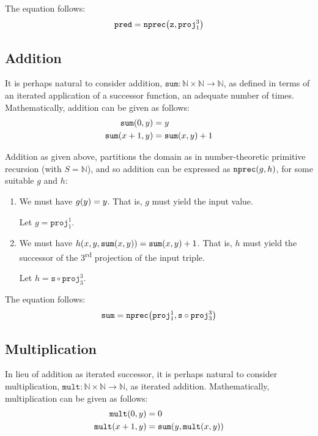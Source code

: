 The equation follows:\begin{align*}
%
\mathtt{pred} = \mathtt{nprec}\p{\mathtt{z}, \mathtt{proj}^3_1}
%
\end{align*}

\subsection{Addition}

It is perhaps natural to consider addition, $\mathtt{sum} : \mathbb{N} \times
\mathbb{N} \rightarrow \mathbb{N}$, as defined in terms of an iterated
application of a successor function, an adequate number of times.
Mathematically, addition can be given as follows:\begin{align*}
%
\mathtt{sum}\p{0, y} &= y \\
%
\mathtt{sum}\p{x+1, y} &= \mathtt{sum}\p{x,y} + 1 
%
\end{align*}

Addition as given above, partitions the domain as in number-theoretic primitive
recursion (with $S = \mathbb{N}$), and so addition can be expressed as
$\mathtt{nprec}{\mathopen{}\left({g,h}\right)\mathclose{}}$, for some suitable $g$ and $h$:

\begin{enumerate}[label=(\arabic*)]

\item We must have $g{\mathopen{}\left({y}\right)\mathclose{}} = y$. That is, $g$ must yield the input value.

Let $g = \mathtt{proj}^1_1$.

\item We must have $h{\mathopen{}\left({x,y,\mathtt{sum}{\mathopen{}\left({x,y}\right)\mathclose{}}}\right)\mathclose{}} = \mathtt{sum}{\mathopen{}\left({x,y}\right)\mathclose{}} + 1$.
That is, $h$ must yield the successor of the 3\textsuperscript{rd} projection
of the input triple.

Let $h = \mathtt{s} \circ \mathtt{proj}^3_3$.

\end{enumerate}

The equation follows:\begin{align*}
%
\mathtt{sum} = \mathtt{nprec}\p{\mathtt{proj}^1_1, \mathtt{s} \circ
\mathtt{proj}^3_3}
%
\end{align*}

\subsection{Multiplication}

In lieu of addition as iterated successor, it is perhaps natural to consider
multiplication, $\mathtt{mult} : \mathbb{N} \times \mathbb{N} \rightarrow
\mathbb{N}$, as iterated addition. Mathematically, multiplication can be given
as follows:\begin{align*}
%
\mathtt{mult}\p{0, y} &= 0 \\
%
\mathtt{mult}\p{x+1,y} &= \mathtt{sum}\p{y, \mathtt{mult}\p{x,y}}
%
\end{align*}

